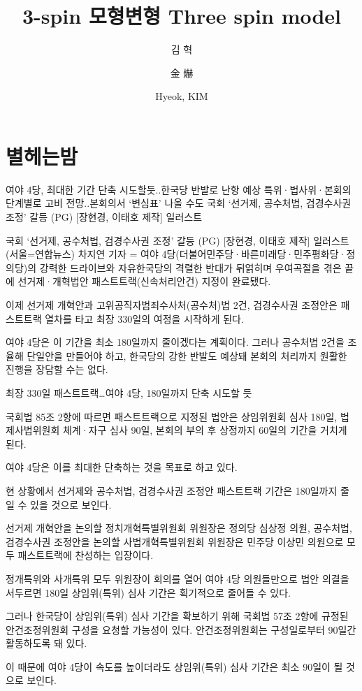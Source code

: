 \documentclass[final,doctor,korean]{konkukreport}
\title[korean]{3-spin 모형변형 }
\title[english]{Three spin model}
\title[subtitle]{}
\author[korean]{김 혁}
\author[hanja]{金 爀}
\author[english]{Hyeok, KIM}
\begin{document}
\makecontents
  
\chapter{별헤는밤}
여야 4당, 최대한 기간 단축 시도할듯..한국당 반발로 난항 예상
특위·법사위·본회의 단계별로 고비 전망..본회의서 `변심표' 나올 수도
국회 `선거제, 공수처법, 검경수사권 조정' 갈등 (PG) [장현경, 이태호 제작] 일러스트

국회 `선거제, 공수처법, 검경수사권 조정' 갈등 (PG) [장현경, 이태호 제작] 일러스트
(서울=연합뉴스) 차지연 기자 = 여야 4당(더불어민주당·바른미래당·민주평화당·정의당)의 강력한 드라이브와 자유한국당의 격렬한 반대가 뒤얽히며 우여곡절을 겪은 끝에 선거제·개혁법안 패스트트랙(신속처리안건) 지정이 완료됐다.

이제 선거제 개혁안과 고위공직자범죄수사처(공수처)법 2건, 검경수사권 조정안은 패스트트랙 열차를 타고 최장 330일의 여정을 시작하게 된다.

여야 4당은 이 기간을 최소 180일까지 줄이겠다는 계획이다. 그러나 공수처법 2건을 조율해 단일안을 만들어야 하고, 한국당의 강한 반발도 예상돼 본회의 처리까지 원활한 진행을 장담할 수는 없다.

최장 330일 패스트트랙…여야 4당, 180일까지 단축 시도할 듯

국회법 85조 2항에 따르면 패스트트랙으로 지정된 법안은 상임위원회 심사 180일, 법제사법위원회 체계·자구 심사 90일, 본회의 부의 후 상정까지 60일의 기간을 거치게 된다.

여야 4당은 이를 최대한 단축하는 것을 목표로 하고 있다.

현 상황에서 선거제와 공수처법, 검경수사권 조정안 패스트트랙 기간은 180일까지 줄일 수 있을 것으로 보인다.

선거제 개혁안을 논의할 정치개혁특별위원회 위원장은 정의당 심상정 의원, 공수처법, 검경수사권 조정안을 논의할 사법개혁특별위원회 위원장은 민주당 이상민 의원으로 모두 패스트트랙에 찬성하는 입장이다.

정개특위와 사개특위 모두 위원장이 회의를 열어 여야 4당 의원들만으로 법안 의결을 서두르면 180일 상임위(특위) 심사 기간은 획기적으로 줄어들 수 있다.

그러나 한국당이 상임위(특위) 심사 기간을 확보하기 위해 국회법 57조 2항에 규정된 안건조정위원회 구성을 요청할 가능성이 있다. 안건조정위원회는 구성일로부터 90일간 활동하도록 돼 있다.

이 때문에 여야 4당이 속도를 높이더라도 상임위(특위) 심사 기간은 최소 90일이 될 것으로 보인다.
\end{document}
